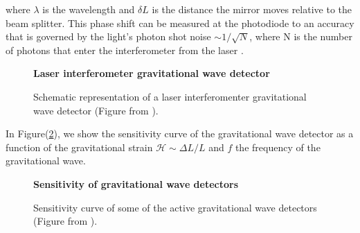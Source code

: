 where $\lambda$ is the wavelength and $\delta L$ is the distance the mirror moves relative to the beam splitter.
This phase shift can be measured at the photodiode to an accuracy that is governed by the light’s photon shot noise $\sim 1/\sqrt{N}$, where N is the number of photons that enter the interferometer from the laser \cite{thorne_gravitational_1995}.%
\begin{figure}[H]
\centering
    \textbf{Laser interferometer gravitational wave detector}\par\medskip
{}
\caption{Schematic representation of a laser interferomenter gravitational wave detector (Figure from \cite{LIGOLaserInterferometer1992}).}
\label{interferometer}
\end{figure}
In Figure(\ref{gw_detetctor}), we show the sensitivity curve of the gravitational wave detector as a function of the gravitational strain $\mathcal{H} \sim\Delta L / L$ and $f$ the frequency of the gravitational wave. 
\begin{figure}[H]
\centering
    \textbf{Sensitivity of gravitational wave detectors}\par\medskip
{}
\caption{Sensitivity curve of some of the active gravitational wave detectors (Figure from \cite{mooreGravitationalwaveSensitivityCurves2015}).}

\label{gw_detetctor}
\end{figure}


